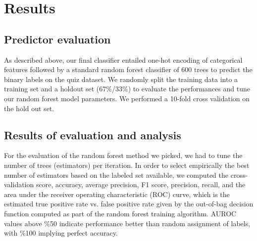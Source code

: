 \documentclass[11pt,a4paper]{article}
\begin{document}
\section{Results}

\subsection{Predictor evaluation}

As described above, our final classifier entailed one-hot encoding of categorical features followed by a standard random forest classifier of 600 trees to predict the binary labels on the quiz dataset. We randomly split the training data into a training set and a holdout set (67\%/33\%) to evaluate the performances and tune our random forest model parameters. We performed a 10-fold cross validation on the hold out set.

\subsection{Results of evaluation and analysis}

For the evaluation of the random forest method we picked, we had to tune the number of trees (estimators) per iteration. In order to select empirically the best number of estimators based on the labeled set available, we computed the cross-validation score, accuracy, average precision, F1 score, precision, recall, and the area under the receiver operating characteristic (ROC) curve, which is the estimated true positive rate vs. false positive rate given by the out-of-bag decision function computed as part of the random forest training algorithm. AUROC values above \%50 indicate performance better than random assignment of labels, with \%100 implying perfect accuracy.
\end{document}
